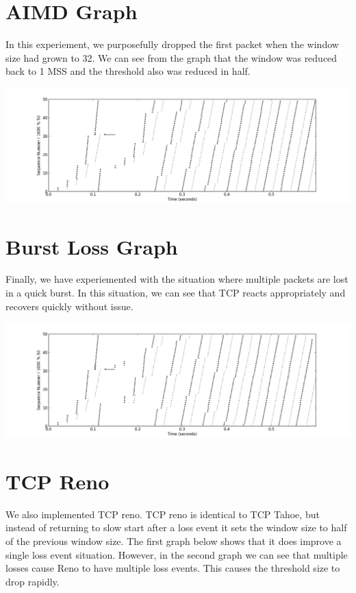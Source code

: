 \documentclass[11pt]{article}
\begin{document}
\section{AIMD Graph}

In this experiement, we purposefully dropped the first packet when the window size had grown to 32. We can see from the graph that the window was reduced back to 1 MSS and the threshold also was reduced in half. 

\centerline{\includegraphics[width=22cm]{AIMD.png}}

\section{Burst Loss Graph}

Finally, we have experiemented with the situation where multiple packets are lost in a quick burst. In this situation, we can see that TCP reacts appropriately and recovers quickly without issue.

\centerline{\includegraphics[width=22cm]{burst_loss.png}}

\section{TCP Reno}
We also implemented TCP reno. TCP reno is identical to TCP Tahoe, but instead of returning to slow start after a loss event it sets the window size to half of the previous window size. The first graph below shows that it does improve a single loss event situation. However, in the second graph we can see that multiple losses cause Reno to have multiple loss events. This causes the threshold size to drop rapidly.
\end{document}
